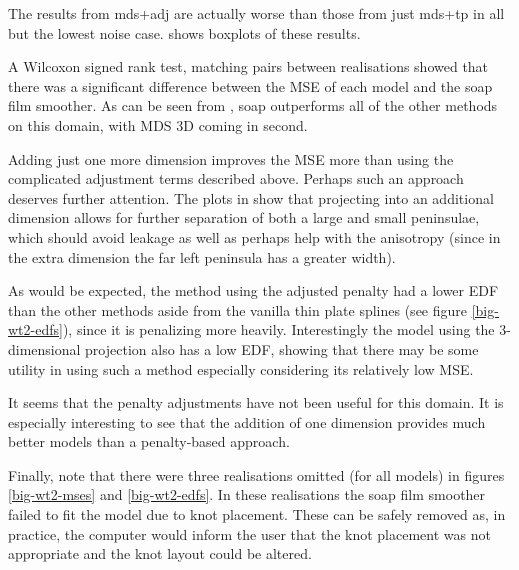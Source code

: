 The results from mds+adj are actually worse than those from just mds+tp in all but the lowest noise case.  shows boxplots of these results.

A Wilcoxon signed rank test, matching pairs between realisations showed that there was a significant difference between the MSE of each model and the soap film smoother. As can be seen from , soap outperforms all of the other methods on this domain, with MDS 3D coming in second. 

Adding just one more dimension improves the MSE more than using the complicated adjustment terms described above. Perhaps such an approach deserves further attention. The plots in  show that projecting into an additional dimension allows for further separation of both a large and small peninsulae, which should avoid leakage as well as perhaps help with the anisotropy (since in the extra dimension the far left peninsula has a greater width). 

As would be expected, the method using the adjusted penalty had a lower EDF than the other methods aside from the vanilla thin plate splines (see figure \ref{big-wt2-edfs}), since it is penalizing more heavily. Interestingly the model using the 3-dimensional projection also has a low EDF, showing that there may be some utility in using such a method especially considering its relatively low MSE.

It seems that the penalty adjustments have not been useful for this domain. It is especially interesting to see that the addition of one dimension provides much better models than a penalty-based approach.

Finally, note that there were three realisations omitted (for all models) in figures \ref{big-wt2-mses} and \ref{big-wt2-edfs}. In these realisations the soap film smoother failed to fit the model due to knot placement. These can be safely removed as, in practice, the computer would inform the user that the knot placement was not appropriate and the knot layout could be altered.

